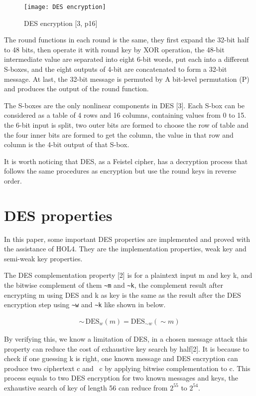 \documentclass{article}
\begin{document}
\begin{figure}
\centering
\texttt{[image: DES encryption]}
\caption{\label{fig:form1} DES encryption [3, p16]}
\end{figure}

The round functions in each round is the same, they first expand the 32-bit half to 48 bits, then operate it with round key by
XOR operation, the 48-bit intermediate value are separated into eight 6-bit words, put each into a different S-boxes, and
the eight outputs of 4-bit are concatenated to form a 32-bit message. At last, the 32-bit message is permuted by
A bit-level permutation (P) and produces the output of the round function.

The S-boxes are the only nonlinear components in DES [3]. Each S-box can be considered as a table of 4 rows and 16 columns, containing values from 0 to 15.
the 6-bit input is split, two outer bits are formed to choose the row of table and the four inner bits are formed to get the
column, the value in that row and column is the 4-bit output of that S-box.

It is worth noticing that DES, as a Feistel cipher, has a decryption process that follows the same procedures as encryption
but use the round keys in reverse order.

\section{DES properties}
In this paper, some important DES properties are implemented and proved with the assistance of HOL4. They are the implementation properties,
weak key and semi-weak key properties.

The DES complementation property [2] is for a plaintext input m and key k, and the bitwise complement of them \verb|~m| and \verb|~k|, the
complement result after encrypting m using DES and k as key is the same as the result after the DES encryption step
using \verb|~w| and \verb|~k| like shown in below.

\begin{equation*}
\begin{split}
   \sim \, \text{DES}_{w}(m) = \text{DES}_{\sim w}(\sim m)
\end{split}
\end{equation*}

By verifying this, we know a limitation of DES, in a chosen message attack
this property can reduce the cost of exhaustive key search by half[2]. It is because to check if one guessing k is right,
one known message and DES encryption can produce two ciphertext c and ~c by applying bitwise complementation to c. This process
equals to two DES encryption for two known messages and keys, the exhaustive search of key of length 56 can reduce from
$2^{55}$ to $2^{54}$.
\end{document}
